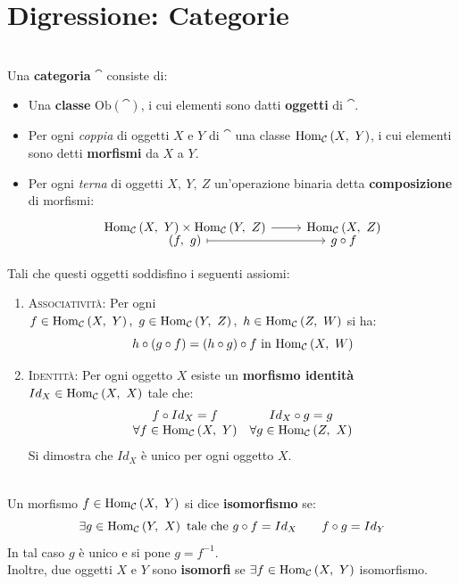 \section{Digressione: Categorie}
\begin{define}[Categoria.]~{}\\
	Una \textbf{categoria} $\cat$ consiste di:
	\begin{itemize}
		\item Una \textbf{classe} $\mathrm{Ob}\left(\cat\right)$, i cui elementi sono datti \textbf{oggetti} di $\cat$.
		\item Per ogni \textit{coppia} di oggetti $X$ e $Y$ di $\cat$ una classe $\mathrm{Hom}_{\mathcal{C}}\left(X,\ Y\right)$, i cui elementi sono detti \textbf{morfismi} da $X$ a $Y$.
		\item Per ogni \textit{terna} di oggetti $X,\ Y,\ Z$ un'operazione binaria detta \textbf{composizione} di morfismi:
		\begin{equation}
			\funztot{\ }{\homo{\cat}{X}{Y}\times \homo{\cat}{Y}{Z}}{\homo{\cat}{X}{Z}}{\left(f,\ g\right)}{g\circ f}
		\end{equation}
	\end{itemize}
Tali che questi oggetti soddisfino i seguenti assiomi:
\begin{enumerate}
	\item \textsc{Associatività}: Per ogni $f\in\homo{\cat}{X}{Y},\ g\in\homo{\cat}{Y}{Z},\ h\in\homo{\cat}{Z}{W}$ si ha:
	\begin{equation}
		h\circ\left(g\circ f\right)=\left(h\circ g\right)\circ f\text{ in }\mathrm{Hom}_{\mathcal{C}}\left(X,\ W\right)
	\end{equation}
	\item \textsc{Identità}: Per ogni oggetto $X$ esiste un \textbf{morfismo identità} $Id_{X}\in\mathrm{Hom}_{\mathcal{C}}\left(X,\ X\right)$ tale che:
	\begin{equation}
		\begin{array}{cc}
			f\circ Id_X=f&Id_X\circ g=g\\
			\forall f\in\mathrm{Hom}_{\mathcal{C}}\left(X,\ Y\right)&\forall g\in\mathrm{Hom}_{\mathcal{C}}\left(Z,\ X\right)
		\end{array}
	\end{equation}
Si dimostra che $Id_X$ è unico per ogni oggetto $X$.
\end{enumerate}
\vspace{-3mm}
\end{define}
\begin{define}[Isomorfismo.]~{}\\
	Un morfismo $f\in\mathrm{Hom}_{\mathcal{C}}\left(X,\ Y\right)$ si dice \textbf{isomorfismo} se:
	\begin{equation}
		 \exists g\in \mathrm{Hom}_{\mathcal{C}}\left(Y,\ X\right) \text{ tale che } g\circ f=Id_X\qquad f\circ g=Id_Y
	\end{equation}
In tal caso $g$ è unico e si pone $g=f^{-1}$.\\
Inoltre, due oggetti $X$ e $Y$ sono \textbf{isomorfi} se $\exists f\in \mathrm{Hom}_{\mathcal{C}}\left(X,\ Y\right)$ isomorfismo.
\end{define}
